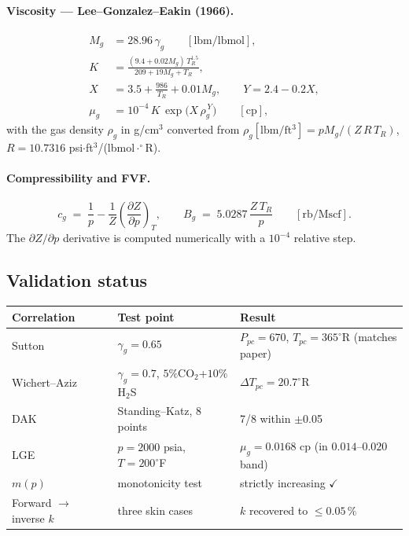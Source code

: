 \documentclass[11pt,a4paper]{article}
\newcommand{\mpres}{m(p)}
\begin{document}
\paragraph{Viscosity — Lee--Gonzalez--Eakin (1966).}
\begin{align}
    M_g &= 28.96\,\gamma_g \qquad [\text{lbm/lbmol}], \\
    K  &= \frac{(9.4 + 0.02 M_g)\,T_R^{1.5}}{209 + 19 M_g + T_R}, \\
    X  &= 3.5 + \frac{986}{T_R} + 0.01 M_g,\qquad
    Y   = 2.4 - 0.2 X, \\
    \mu_g &= 10^{-4}\,K\,\exp\!\bigl(X\,\rho_g^{\,Y}\bigr) \qquad [\mathrm{cp}],
\end{align}
with the gas density $\rho_g$ in g/cm$^3$ converted from
$\rho_g [\mathrm{lbm/ft^3}] = p M_g/(Z\,R\,T_R)$, $R = 10.7316$
psi$\cdot$ft$^3$/(lbmol$\cdot^\circ$R).

\paragraph{Compressibility and FVF.}
\begin{equation}
    c_g \;=\; \frac{1}{p} - \frac{1}{Z}\!\left(\frac{\partial Z}{\partial p}\right)_T,
    \qquad
    B_g \;=\; 5.0287\,\frac{Z\,T_R}{p} \qquad [\mathrm{rb/Mscf}].
\end{equation}
The $\partial Z/\partial p$ derivative is computed numerically with a
$10^{-4}$ relative step.

\subsection{Validation status}

\begin{tabular}{lll}
\toprule
\textbf{Correlation} & \textbf{Test point} & \textbf{Result} \\
\midrule
Sutton           & $\gamma_g=0.65$                  & $P_{pc}=670$, $T_{pc}=365^\circ$R (matches paper) \\
Wichert--Aziz    & $\gamma_g=0.7$, $5\%$CO$_2$+$10\%$H$_2$S & $\Delta T_{pc}=20.7^\circ$R \\
DAK              & Standing--Katz, 8 points         & 7/8 within $\pm$0.05 \\
LGE              & $p=2000$ psia, $T=200^\circ$F    & $\mu_g=0.0168$ cp (in $0.014$--$0.020$ band) \\
$\mpres$            & monotonicity test                & strictly increasing $\checkmark$ \\
Forward $\to$ inverse $k$ & three skin cases       & $k$ recovered to $\le 0.05\,\%$ \\
\bottomrule
\end{tabular}
\end{document}
